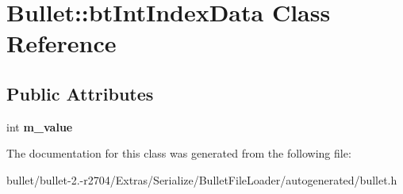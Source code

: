 \hypertarget{class_bullet_1_1bt_int_index_data}{\section{Bullet\+:\+:bt\+Int\+Index\+Data Class Reference}
\label{class_bullet_1_1bt_int_index_data}
}
\subsection*{Public Attributes}
\begin{DoxyCompactItemize}
\item 
\hypertarget{class_bullet_1_1bt_int_index_data_aef727eb6f64af7caf6785e9d7eee8c12}{int {\bfseries m\+\_\+value}}\label{class_bullet_1_1bt_int_index_data_aef727eb6f64af7caf6785e9d7eee8c12}

\end{DoxyCompactItemize}


The documentation for this class was generated from the following file\+:\begin{DoxyCompactItemize}
\item 
bullet/bullet-\/2.-\/r2704/\+Extras/\+Serialize/\+Bullet\+File\+Loader/autogenerated/bullet.\+h\end{DoxyCompactItemize}
